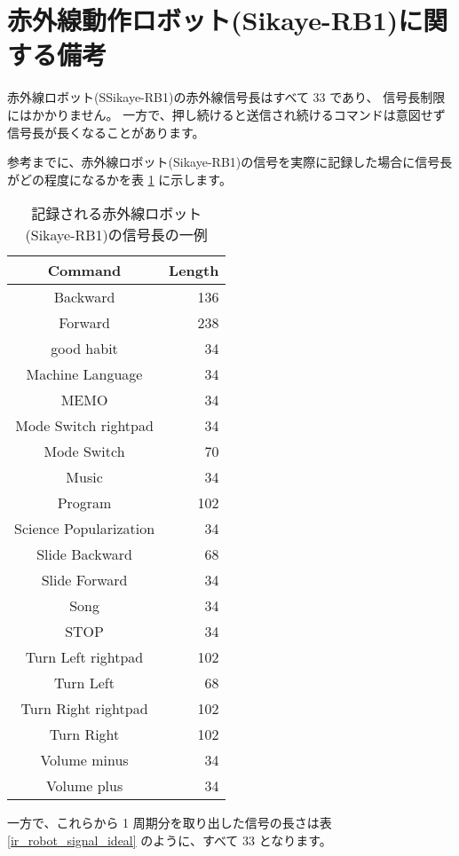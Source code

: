 \section{赤外線動作ロボット(Sikaye-RB1)に関する備考} \label{ir_robot_notice}
赤外線ロボット(SSikaye-RB1)の赤外線信号長はすべて 33 であり、
信号長制限にはかかりません。
一方で、押し続けると送信され続けるコマンドは意図せず信号長が長くなることがあります。

参考までに、赤外線ロボット(Sikaye-RB1)の信号を実際に記録した場合に信号長がどの程度になるかを表 \ref{ir_robot_signal} に示します。

\begin{table}[htbp] \begin{center}
    \caption{記録される赤外線ロボット(Sikaye-RB1)の信号長の一例}
    \label{ir_robot_signal}
    \begin{tabular}{cr}
\hline
Command & Length \\
\hline
Backward & 136 \\
Forward & 238 \\
good habit & 34 \\
Machine Language & 34 \\
MEMO & 34 \\
Mode Switch rightpad & 34 \\
Mode Switch & 70 \\
Music & 34 \\
Program & 102 \\
Science Popularization & 34 \\
Slide Backward & 68 \\
Slide Forward & 34 \\
Song & 34 \\
STOP & 34 \\
Turn Left rightpad & 102 \\
Turn Left & 68 \\
Turn Right rightpad & 102 \\
Turn Right & 102 \\
Volume minus & 34 \\
Volume plus & 34 \\
\hline
    \end{tabular}
\end{center} \end{table}

一方で、これらから 1 周期分を取り出した信号の長さは表 \ref{ir_robot_signal_ideal} のように、すべて 33 となります。

